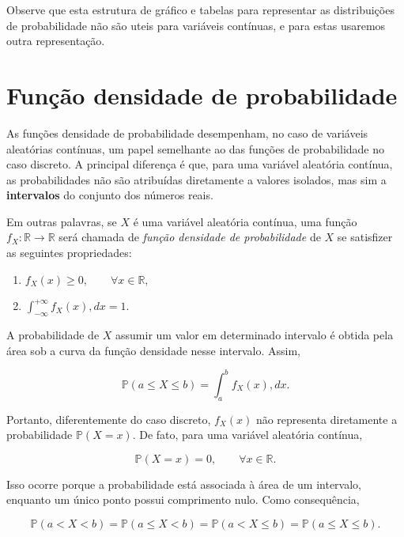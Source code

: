 Observe que esta estrutura de gráfico e tabelas para representar as distribuições de probabilidade não são uteis para variáveis contínuas, e para estas usaremos outra representação. 

\section{Função densidade de probabilidade}
	As funções densidade de probabilidade desempenham, no caso de variáveis aleatórias contínuas, um papel semelhante ao das funções de probabilidade no caso discreto. A principal diferença é que, para uma variável aleatória contínua, as probabilidades não são atribuídas diretamente a valores isolados, mas sim a \textbf{intervalos } do conjunto dos números reais.

Em outras palavras, se \(X\) é uma variável aleatória contínua, uma função \(f_X:\mathbb{R}\to\mathbb{R}\) será chamada de \textit{função densidade de probabilidade} de \(X\) se satisfizer as seguintes propriedades:

\begin{enumerate}
    \item[(i)] $ f_X(x)\geq 0,\qquad \forall x\in\mathbb{R},$\\
    \item[(ii)]$\int_{-\infty}^{+\infty}f_X(x),dx=1.$
\end{enumerate}

A probabilidade de \(X\) assumir um valor em determinado intervalo é obtida pela área sob a curva da função densidade nesse intervalo. Assim,

\begin{equation}
\mathbb P(a\leq X\leq b)=\int_a^b f_X(x),dx.
\end{equation}

Portanto, diferentemente do caso discreto, $f_X(x)$ não representa diretamente a probabilidade $\mathbb P(X=x)$. De fato, para uma variável aleatória contínua,

\begin{equation}
\mathbb P(X=x)=0,\qquad \forall x\in\mathbb{R}.
\end{equation}

Isso ocorre porque a probabilidade está associada à área de um intervalo, enquanto um único ponto possui comprimento nulo. Como consequência,

\begin{equation}
    \mathbb P(a<X<b)=\mathbb P(a\leq X<b)=\mathbb P(a<X\leq b)=\mathbb P(a\leq X\leq b).
\end{equation}

